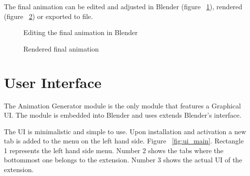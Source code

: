 The final animation can be edited and adjusted in Blender (figure ~\ref{fig:finalblend}), rendered (figure ~\ref{fig:finalrend}) or exported to file.


\begin{figure}[!ht]
\centerline{}
\caption{Editing the final animation in Blender}\label{fig:finalblend}
\end{figure}
\begin{figure}[!ht]
\centerline{}
\caption{Rendered final animation}\label{fig:finalrend}
\end{figure}

\section{User Interface}

The Animation Generator module is the only module that features a Graphical UI. The module is embedded into Blender and uses extends Blender's interface. 

The UI is minimalistic and simple to use. Upon installation and activation a new tab is added to the menu on the left hand side. Figure ~\ref {fig:ui_main}. Rectangle 1 represents the left hand side menu. Number 2 shows the tabs where the bottommost one belongs to the extension. Number 3 shows the actual UI of the extension.

